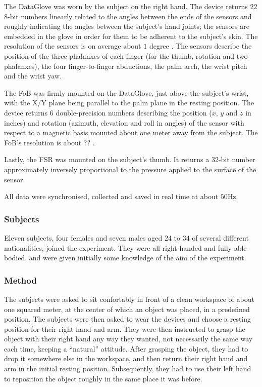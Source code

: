 The DataGlove was worn by the subject on the right hand. The device
returns $22$ $8$-bit numbers linearly related to the angles between
the ends of the sensors and roughly indicating the angles between the
subject's hand joints; the sensors are embedded in the glove in order
for them to be adherent to the subject's skin. The resolution of the
sensors is on average about $1$ degree \cite{dataglove_res}. The
sensors describe the position of the three phalanxes of each finger
(for the thumb, rotation and two phalanxes), the four finger-to-finger
abductions, the palm arch, the wrist pitch and the wrist yaw.

The FoB was firmly mounted on the DataGlove, just above the subject's
wrist, with the X/Y plane being parallel to the palm plane in the
resting position. The device returns $6$ double-precision numbers
describing the position ($x$, $y$ and $z$ in inches) and rotation
(azimuth, elevation and roll in angles) of the sensor with respect to
a magnetic basis mounted about one meter away from the subject. The
FoB's resolution is about $??$ \cite{fob_res}.

Lastly, the FSR was mounted on the subject's thumb. It returns a
$32$-bit number approximately inversely proportional to the pressure
applied to the surface of the sensor.

All data were synchronised, collected and saved in real time at about
$50$Hz.

\subsubsection*{Subjects}

Eleven subjects, four females and seven males aged $24$ to $34$ of
several different nationalities, joined the experiment. They were all
right-handed and fully able-bodied, and were given initially some
knowledge of the aim of the experiment.

\subsubsection*{Method}

The subjects were asked to sit confortably in front of a clean
workspace of about one squared meter, at the center of which an object
was placed, in a predefined position. The subjects were then asked to
wear the devices and choose a resting position for their right hand
and arm. They were then instructed to grasp the object with their
right hand any way they wanted, not necessarily the same way each
time, keeping a ``natural'' attitude. After grasping the object, they
had to drop it somewhere else in the workspace, and then return their
right hand and arm in the initial resting position. Subsequently, they
had to use their left hand to reposition the object roughly in the
same place it was before.

